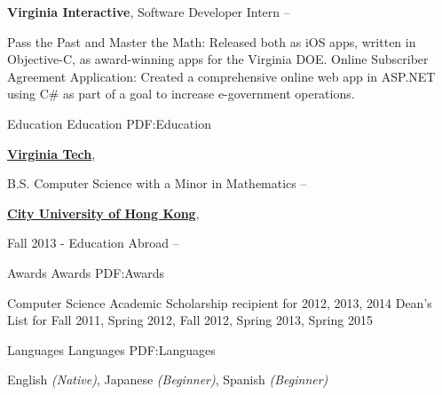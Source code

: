 \documentclass[letterpaper,MMMyyyy,nonstopmode]{simpleresumecv}
\begin{document}
\begin{Body}
\BigGap
\Entry
{\textbf{Virginia Interactive}},
Software Developer Intern
\hfill
{} --

\Gap
\BulletItem
Pass the Past and Master the Math: Released both as iOS apps, written in Objective-C, as award-winning apps for the Virginia DOE.
\BulletItem
Online Subscriber Agreement Application: Created a comprehensive online web app in ASP.NET using C# as part of a goal to increase e-government operations.


\Section
{Education}
{Education}
{PDF:Education}

\Entry
\href{http://www.example.com/my-college}
{\textbf{Virginia Tech}},

\Gap
\BulletItem
B.S. Computer Science with a Minor in Mathematics
\hfill
{} --

\BigGap
\Entry
\href{http://www.example.com/my-college}
{\textbf{City University of Hong Kong}},

\Gap
\BulletItem
Fall 2013 - Education Abroad
\hfill
{} --


\Section
{Awards}
{Awards}
{PDF:Awards}

\BulletItem
Computer Science Academic Scholarship recipient for 2012, 2013, 2014
\Gap
\BulletItem
Dean’s List for Fall 2011, Spring 2012, Fall 2012, Spring 2013, Spring 2015



\Section
{Languages}
{Languages}
{PDF:Languages}

English
\textit{(Native)},
Japanese
\textit{(Beginner)},
Spanish
\textit{(Beginner)}

\end{Body}
\end{document}
